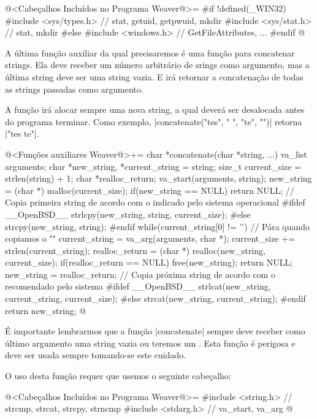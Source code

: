 \iniciocodigo
@<Cabeçalhos Incluídos no Programa Weaver@>=
#if !defined(_WIN32)
#include <sys/types.h> // stat, getuid, getpwuid, mkdir
#include <sys/stat.h> // stat, mkdir
#else
#include <windows.h> // GetFileAttributes, ...
#endif
@
\fimcodigo


A última função auxiliar da qual precisaremos é uma função para
concatenar strings. Ela deve receber um número arbitrário de srings
como argumento, mas a última string deve ser uma string vazia. E irá
retornar a concatenação de todas as strings passadas como argumento.

A função irá alocar sempre uma nova string, a qual deverá ser
desalocada antes do programa terminar. Como exemplo,
|concatenate("tes", " ", "te", "")| retorna |"tes te"|.

\iniciocodigo
@<Funções auxiliares Weaver@>+=
char *concatenate(char *string, ...){
  va_list arguments;
  char *new_string, *current_string = string;
  size_t current_size = strlen(string) + 1;
  char *realloc_return;
  va_start(arguments, string);
  new_string = (char *) malloc(current_size);
  if(new_string == NULL) return NULL;
   // Copia primeira string de acordo com o indicado pelo sistema operacional
#ifdef __OpenBSD__
  strlcpy(new_string, string, current_size);
#else
  strcpy(new_string, string);
#endif
  while(current_string[0] != '\0'){ // Pára quando copiamos o ""
    current_string = va_arg(arguments, char *);
    current_size += strlen(current_string);
    realloc_return = (char *) realloc(new_string, current_size);
    if(realloc_return == NULL){
      free(new_string);
      return NULL;
    }
    new_string = realloc_return;
     // Copia próxima string de acordo com o recomendado pelo sistema
#ifdef __OpenBSD__
    strlcat(new_string, current_string, current_size);
#else
    strcat(new_string, current_string);
#endif
  }
  return new_string;
}
@
\fimcodigo

É importante lembrarmos que a função |concatenate| sempre deve receber
como último argumento uma string vazia ou teremos um . Esta função é perigosa e deve ser usada sempre tomando-se
este cuidado.

O uso desta função requer que usemos o seguinte cabeçalho:

\iniciocodigo
@<Cabeçalhos Incluídos no Programa Weaver@>=
#include <string.h> // strcmp, strcat, strcpy, strncmp
#include <stdarg.h> // va_start, va_arg
@
\fimcodigo

